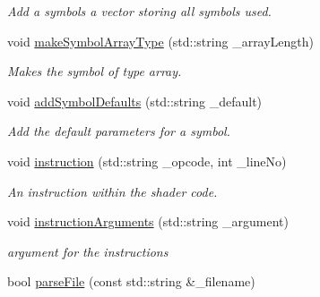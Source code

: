 \begin{DoxyCompactItemize}
\begin{DoxyCompactList}\small\item\em Add a symbols a vector storing all symbols used. \end{DoxyCompactList}\item 
\hypertarget{class_oso_reader_a25a7abbbf34ef2504f1f442206d18998}{void \hyperlink{class_oso_reader_a25a7abbbf34ef2504f1f442206d18998}{make\-Symbol\-Array\-Type} (std\-::string \-\_\-array\-Length)}\label{class_oso_reader_a25a7abbbf34ef2504f1f442206d18998}

\begin{DoxyCompactList}\small\item\em Makes the symbol of type array. \end{DoxyCompactList}\item 
\hypertarget{class_oso_reader_a40420f55aaafd4f006204f6d4240127d}{void \hyperlink{class_oso_reader_a40420f55aaafd4f006204f6d4240127d}{add\-Symbol\-Defaults} (std\-::string \-\_\-default)}\label{class_oso_reader_a40420f55aaafd4f006204f6d4240127d}

\begin{DoxyCompactList}\small\item\em Add the default parameters for a symbol. \end{DoxyCompactList}\item 
\hypertarget{class_oso_reader_ae8411b4acd37c94e749d4cfdb140695c}{void \hyperlink{class_oso_reader_ae8411b4acd37c94e749d4cfdb140695c}{instruction} (std\-::string \-\_\-opcode, int \-\_\-line\-No)}\label{class_oso_reader_ae8411b4acd37c94e749d4cfdb140695c}

\begin{DoxyCompactList}\small\item\em An instruction within the shader code. \end{DoxyCompactList}\item 
\hypertarget{class_oso_reader_afa815b45d1f74238f8b141382df388f3}{void \hyperlink{class_oso_reader_afa815b45d1f74238f8b141382df388f3}{instruction\-Arguments} (std\-::string \-\_\-argument)}\label{class_oso_reader_afa815b45d1f74238f8b141382df388f3}

\begin{DoxyCompactList}\small\item\em argument for the instructions \end{DoxyCompactList}\item 
\hypertarget{class_oso_reader_a1416bafd061691edacb6b38b63d66431}{bool \hyperlink{class_oso_reader_a1416bafd061691edacb6b38b63d66431}{parse\-File} (const std\-::string \&\-\_\-filename)}\label{class_oso_reader_a1416bafd061691edacb6b38b63d66431}


\end{DoxyCompactItemize}
